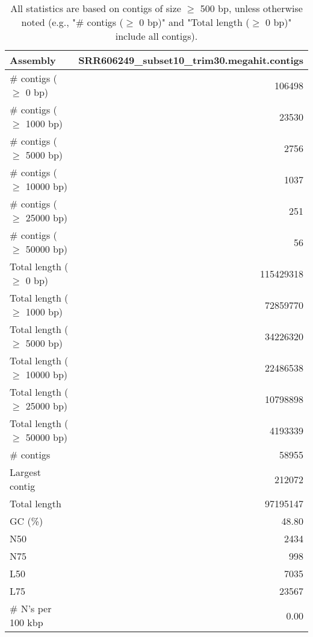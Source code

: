 \documentclass[12pt,a4paper]{article}
\begin{document}
\begin{table}[ht]
\begin{center}
\caption{All statistics are based on contigs of size $\geq$ 500 bp, unless otherwise noted (e.g., "\# contigs ($\geq$ 0 bp)" and "Total length ($\geq$ 0 bp)" include all contigs).}
\begin{tabular}{|l*{1}{|r}|}
\hline
Assembly & SRR606249\_subset10\_trim30.megahit.contigs \\ \hline
\# contigs ($\geq$ 0 bp) & 106498 \\ \hline
\# contigs ($\geq$ 1000 bp) & 23530 \\ \hline
\# contigs ($\geq$ 5000 bp) & 2756 \\ \hline
\# contigs ($\geq$ 10000 bp) & 1037 \\ \hline
\# contigs ($\geq$ 25000 bp) & 251 \\ \hline
\# contigs ($\geq$ 50000 bp) & 56 \\ \hline
Total length ($\geq$ 0 bp) & 115429318 \\ \hline
Total length ($\geq$ 1000 bp) & 72859770 \\ \hline
Total length ($\geq$ 5000 bp) & 34226320 \\ \hline
Total length ($\geq$ 10000 bp) & 22486538 \\ \hline
Total length ($\geq$ 25000 bp) & 10798898 \\ \hline
Total length ($\geq$ 50000 bp) & 4193339 \\ \hline
\# contigs & 58955 \\ \hline
Largest contig & 212072 \\ \hline
Total length & 97195147 \\ \hline
GC (\%) & 48.80 \\ \hline
N50 & 2434 \\ \hline
N75 & 998 \\ \hline
L50 & 7035 \\ \hline
L75 & 23567 \\ \hline
\# N's per 100 kbp & 0.00 \\ \hline
\end{tabular}
\end{center}
\end{table}
\end{document}
